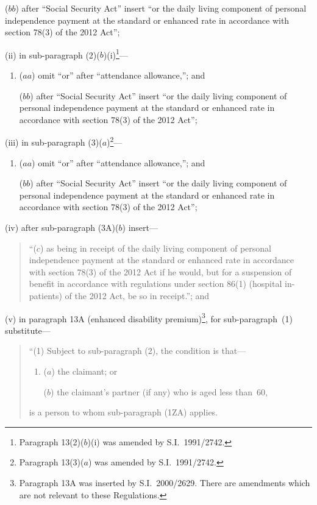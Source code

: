 \documentclass[12pt,a4paper]{article}
\begin{document}
\begin{enumerate}
\begin{enumerate}
\begin{enumerate}
($bb$) after “Social Security Act” insert “or the daily living component of personal independence payment at the standard or enhanced rate in accordance with section 78(3) of the 2012 Act”;
\end{enumerate}

(ii) in sub-paragraph (2)($b$)(i)\footnote{Paragraph 13(2)($b$)(i)  was amended by S.I.~1991/2742.}—
\begin{enumerate}\item[]
($aa$) omit “or” after “attendance allowance,”; and

($bb$) after “Social Security Act” insert “or the daily living component of personal independence payment at the standard or enhanced rate in accordance with section 78(3) of the 2012 Act”;
\end{enumerate}

(iii) in sub-paragraph (3)($a$)\footnote{Paragraph 13(3)($a$)  was amended by S.I.~1991/2742.}—
\begin{enumerate}\item[]
($aa$) omit “or” after “attendance allowance,”; and

($bb$) after “Social Security Act” insert “or the daily living component of personal independence payment at the standard or enhanced rate in accordance with section 78(3) of the 2012 Act”;
\end{enumerate}

(iv) after sub-paragraph (3A)($b$)  insert—
\begin{quotation}
“($c$) as being in receipt of the daily living component of personal independence payment at the standard or enhanced rate in accordance with section 78(3) of the 2012 Act if he would, but for a suspension of benefit in accordance with regulations under section 86(1) (hospital in-patients) of the 2012 Act, be so in receipt.”; and
\end{quotation}

\begin{sloppypar}
(v) in paragraph 13A (enhanced disability premium)\footnote{Paragraph 13A was inserted by S.I.~2000/2629. There are amendments which are not relevant to these Regulations.}, for sub-paragraph~(1) substitute—
\end{sloppypar}
\begin{quotation}
“(1) Subject to sub-paragraph (2), the condition is that—
\begin{enumerate}\item[]
($a$) the claimant; or

($b$) the claimant’s partner (if any) who is aged less than~60,
\end{enumerate}
is a person to whom sub-paragraph (1ZA) applies.


\end{quotation}
\end{enumerate}
\end{enumerate}
\end{document}
